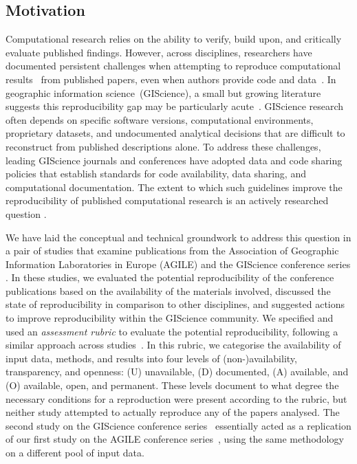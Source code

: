 \documentclass{josis}
\begin{document}
\subsection{Motivation}
\label{sec:motivation}
Computational research relies on the ability to verify, build upon, and critically evaluate published findings. 
However, across disciplines, researchers have documented persistent challenges when attempting to reproduce computational results~\cite{barba_terminologies_2018, nasem_reproducibility_2019, DiCosmo2025} from published papers, even when authors provide code and data~\cite{konkol_computational_2019, obels_analysis_2020, kambouris_computationally_2024, brodeur_mass_2024}. 
In geographic information science~(GIScience), a small but growing literature suggests this reproducibility gap may be particularly acute~\cite{konkol_computational_2019, koukouraki_map_2023}. 
GIScience research often depends on specific software versions, computational environments, proprietary datasets, and undocumented analytical decisions that are difficult to reconstruct from published descriptions alone.
To address these challenges, leading GIScience journals and conferences have adopted data and code sharing policies that establish standards for code availability, data sharing, and computational documentation.
The extent to which such guidelines improve the reproducibility of published computational research is an actively researched question \cite{stodden_empirical_2018, Hardwicke2018, Fiar2024}.

We have laid the conceptual and technical groundwork to address this question in a pair of studies that examine publications from the Association of Geographic Information Laboratories in Europe (AGILE) and the GIScience conference series \cite{nust2018, ostermann2021}. 
In these studies, we evaluated the potential reproducibility of the conference publications based on the availability of the materials involved, discussed the state of reproducibility in comparison to other disciplines, and suggested actions to improve reproducibility within the GIScience community. We specified and used an \emph{assessment rubric} to evaluate the potential reproducibility, following a similar approach across studies~\cite{nust2018, ostermann2021}. In this rubric, we categorise the availability of input data, methods, and results into four levels of (non-)availability, transparency, and openness: (U) unavailable, (D) documented, (A) available, and (O) available, open, and permanent.
These levels document to what degree the necessary conditions for a reproduction were present according to the rubric, but neither study attempted to actually reproduce any of the papers analysed.
The second study on the GIScience conference series~\cite{ostermann2021} essentially acted as a replication of our first study on the AGILE conference series~\cite{nust2018}, using the same methodology on a different pool of input data.
\end{document}
